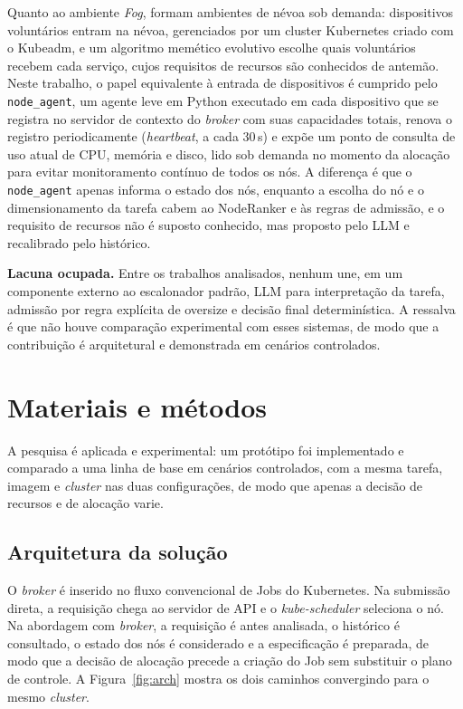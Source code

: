 \documentclass[11pt,a4paper]{article}
\begin{document}
Quanto ao ambiente \textit{Fog},  formam
ambientes de névoa sob demanda: dispositivos voluntários entram na névoa,
gerenciados por um cluster Kubernetes criado com o Kubeadm, e um algoritmo
memético evolutivo escolhe quais voluntários recebem cada serviço, cujos
requisitos de recursos são conhecidos de antemão. Neste trabalho, o papel
equivalente à entrada de dispositivos é cumprido pelo \texttt{node\_agent},
um agente leve em Python executado em cada dispositivo que se registra no
servidor de contexto do \textit{broker} com suas capacidades totais, renova o
registro periodicamente (\textit{heartbeat}, a cada $30$\,s) e expõe um ponto de
consulta de uso atual de CPU, memória e disco, lido sob demanda no momento da
alocação para evitar monitoramento contínuo de todos os nós. A diferença é que
o \texttt{node\_agent} apenas informa o estado dos nós, enquanto a escolha do
nó e o dimensionamento da tarefa cabem ao NodeRanker e às regras de admissão,
e o requisito de recursos não é suposto conhecido, mas proposto pelo LLM e
recalibrado pelo histórico.

\textbf{Lacuna ocupada.} Entre os trabalhos analisados, nenhum une, em um
componente externo ao escalonador padrão, LLM para interpretação da tarefa,
admissão por regra explícita de oversize e decisão final determinística. A
ressalva é que não houve comparação experimental com esses sistemas, de modo
que a contribuição é arquitetural e demonstrada em cenários controlados.

\section{Materiais e métodos}\label{sec:metodos}

A pesquisa é aplicada e experimental: um protótipo foi implementado e
comparado a uma linha de base em cenários controlados, com a mesma tarefa,
imagem e \textit{cluster} nas duas configurações, de modo que apenas a decisão de
recursos e de alocação varie.

\subsection{Arquitetura da solução}

O \textit{broker} é inserido no fluxo convencional de Jobs do Kubernetes. Na
submissão direta, a requisição chega ao servidor de API e o
\textit{kube-scheduler} seleciona o nó. Na abordagem com \textit{broker}, a
requisição é antes analisada, o histórico é consultado, o estado dos nós é
considerado e a especificação é preparada, de modo que a decisão de alocação
precede a criação do Job sem substituir o plano de controle. A
Figura~\ref{fig:arch} mostra os dois caminhos convergindo para o mesmo
\textit{cluster}.
\end{document}

